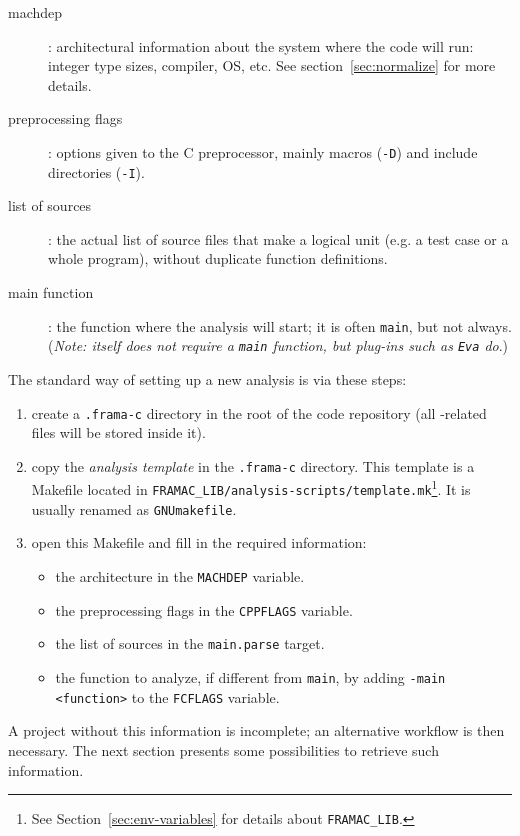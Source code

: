 \begin{description}
\item[machdep]: architectural information about the system where the code will
  run: integer type sizes, compiler, OS, etc.
  See section~\ref{sec:normalize} for more details.
\item[preprocessing flags]: options given to the C preprocessor, mainly
  macros (\texttt{-D}) and include directories (\texttt{-I}).
\item[list of sources]: the actual list of source files that make a logical
  unit (e.g. a test case or a whole program), without duplicate function
  definitions.
\item[main function]: the function where the analysis will start; it is often
  \texttt{main}, but not always. ({\em Note: \FramaC itself does not require
    a \texttt{main} function, but plug-ins such as \texttt{Eva} do}.)
\end{description}

The standard way of setting up a new analysis is via these steps:

\begin{enumerate}
\item create a \texttt{.frama-c} directory in the root of the code repository
  (all \FramaC-related files will be stored inside it).
\item copy the {\em analysis template} in the \texttt{.frama-c} directory.
  This template is a Makefile located in
  \texttt{FRAMAC\_LIB/analysis-scripts/template.mk}\footnote{See
  Section~\ref{sec:env-variables} for details about \texttt{FRAMAC\_LIB}.}.
  It is usually renamed as \texttt{GNUmakefile}.
\item open this Makefile and fill in the required information:
  \begin{itemize}
    \item the architecture in the \texttt{MACHDEP} variable.
    \item the preprocessing flags in the \texttt{CPPFLAGS} variable.
    \item the list of sources in the \texttt{main.parse} target.
    \item the function to analyze, if different from \texttt{main}, by
    adding \texttt{-main <function>} to the \texttt{FCFLAGS} variable.
  \end{itemize}
\end{enumerate}

A project without this information is incomplete; an alternative
workflow is then necessary. The next section presents some possibilities to
retrieve such information.


